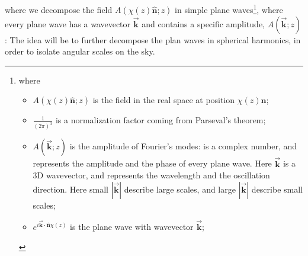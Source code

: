 where we decompose the field $A(\chi(z) \hat{\textbf{n}}; z)$ in simple plane waves\footnote{where 
\begin{itemize}
    \item $A(\chi(z) \hat{\textbf{n}}; z)$ is the field in the real space at position $\chi(z) \hat{\textbf{n}}$; 
    \item $\frac{1}{(2\pi)^3}$ is a normalization factor coming from Parseval's theorem; 
    \item $A(\vec{\textbf{k}}; z)$ is the amplitude of Fourier's modes: is a complex number, and represents the amplitude and the phase of every plane wave. Here $\vec{\textbf{k}}$ is a 3D wavevector, and represents the wavelength and the oscillation direction. Here small $|{\vec{\textbf{k}}}|$ describe large scales, and large $|{\vec{\textbf{k}}}|$ describe small scales;
    \item $e^{i\vec{\textbf{k}}\cdot\hat{\textbf{n}}\chi(z)}$ is the plane wave with wavevector ${\vec{\textbf{k}}}$;
\end{itemize}
}, where every plane wave has a wavevector $\vec{\textbf{k}}$ and contains a specific amplitude, $A(\vec{\textbf{k}}; z)$:
The idea will be to further decompose the plan waves in spherical harmonics, in order to isolate angular scales on the sky. \\

